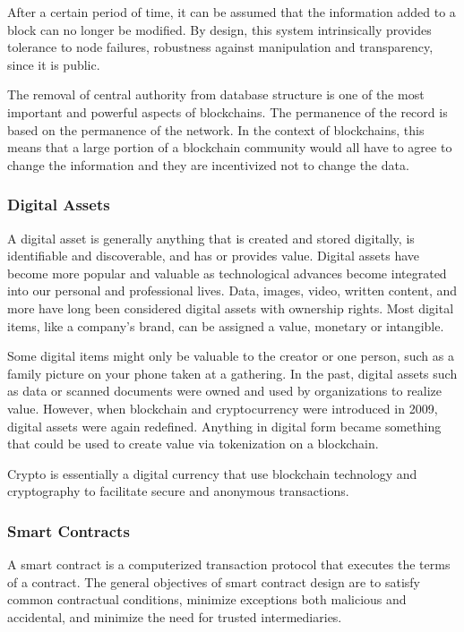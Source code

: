 \documentclass[MSE,Master,english]{twbook}%
\begin{document}
After a certain period of time, it can be assumed that the information added to a block can no longer be modified. By design, this system intrinsically provides tolerance to node failures, robustness against manipulation and transparency, since it is public.

The removal of central authority from database structure is one of the most important and powerful aspects of blockchains. The permanence of the record is based on the permanence of the network. In the context of blockchains, this means that a large portion of a blockchain community would all have to agree to change the information and they are incentivized not to change the data.

\subsubsection{Digital Assets}
A digital asset is generally anything that is created and stored digitally, is identifiable and discoverable, and has or provides value. Digital assets have become more popular and valuable as technological advances become integrated into our personal and professional lives. Data, images, video, written content, and more have long been considered digital assets with ownership rights. Most digital items, like a company's brand, can be assigned a value, monetary or intangible.

Some digital items might only be valuable to the creator or one person, such as a family picture on your phone taken at a gathering. In the past, digital assets such as data or scanned documents were owned and used by organizations to realize value. However, when blockchain and cryptocurrency were introduced in 2009, digital assets were again redefined. Anything in digital form became something that could be used to create value via tokenization on a blockchain.

Crypto is essentially a digital currency that use blockchain technology and cryptography to facilitate secure and anonymous transactions.

\subsubsection{Smart Contracts}
A smart contract is a computerized transaction protocol that executes the terms of a contract. The general objectives of smart contract design are to satisfy common contractual conditions, minimize exceptions both malicious and accidental, and minimize the need for trusted intermediaries.
\end{document}
